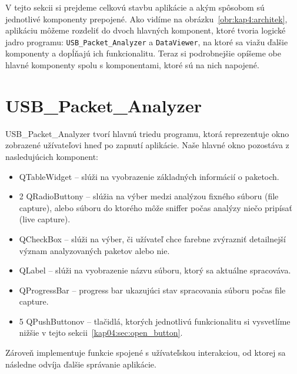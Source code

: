 V tejto sekcii si prejdeme celkovú stavbu aplikácie a akým spôsobom sú jednotlivé komponenty prepojené. Ako vidíme na obrázku~\ref{obr:kap4:architek}, aplikáciu môžeme rozdeliť do dvoch hlavných komponent, ktoré tvoria logické jadro programu: \texttt{USB\_Packet\_Analyzer} a \texttt{DataViewer}, na ktoré sa viažu ďalšie komponenty a dopĺňajú ich funkcionalitu. Teraz si podrobnejšie opíšeme obe hlavné komponenty spolu s komponentami, ktoré sú na nich napojené.

\section{USB\_Packet\_Analyzer}

USB\_Packet\_Analyzer tvorí hlavnú triedu programu, ktorá reprezentuje ok\-no zobrazené užívateľovi hneď po zapnutí aplikácie. Naše hlavné okno pozostáva z nasledujúcich komponent:
\begin{itemize}
\item QTableWidget -- slúži na vyobrazenie základných informácií o paketoch.
\item 2 QRadioButtony -- slúžia na výber medzi analýzou fixného súboru (file capture), alebo súboru do ktorého môže sniffer počas analýzy niečo pripísať (live capture).
\item QCheckBox -- slúži na výber, či užívateľ chce farebne zvýrazniť detailnejší význam analyzovaných paketov alebo nie.
\item QLabel -- slúži na vyobrazenie názvu súboru, ktorý sa aktuálne spracováva.
\item QProgressBar -- progress bar ukazujúci stav spracovania súboru počas file capture.
\item 5 QPushButtonov -- tlačidlá, ktorých jednotlivú funkcionalitu si vysvetlíme nižšie v tejto sekcii~\ref{kap04:sec:open_button}.
\end{itemize}
Zároveň implementuje funkcie spojené s užívateľskou interakciou, od ktorej sa následne odvíja ďalšie správanie aplikácie.

